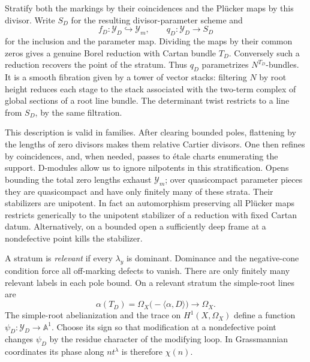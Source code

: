 Stratify both the markings by their coincidences and the Pl\"ucker maps by
this divisor. Write $S_D$ for the resulting divisor-parameter scheme and
\[
 f_D:\mathcal Y_D\hookrightarrow\mathcal Y_m,\qquad
 q_D:\mathcal Y_D\longrightarrow S_D
\]
for the inclusion and the parameter map. Dividing the maps by their common
zeros gives a genuine Borel reduction with Cartan bundle $T_D$.
Conversely such a reduction recovers the point of the stratum. Thus
$q_D$ parametrizes $N^{T_D}$-bundles. It is a smooth fibration given by a
tower of vector stacks: filtering $N$ by root height reduces each stage
to the stack associated with the two-term complex of global sections of
a root line bundle. The determinant twist restricts to a line from $S_D$,
by the same filtration.

This description is valid in families. After clearing bounded poles,
flattening by the lengths of zero divisors makes them relative Cartier
divisors. One then refines by coincidences, and, when needed, passes to
\'etale charts enumerating the support. D-modules allow us to ignore
nilpotents in this stratification. Opens bounding the total zero lengths
exhaust $\mathcal Y_m$; over quasicompact parameter pieces they are
quasicompact and have only finitely many of these strata. Their
stabilizers are unipotent. In fact an automorphism preserving all
Pl\"ucker maps restricts generically to the unipotent stabilizer of a
reduction with fixed Cartan datum. Alternatively, on a bounded open a
sufficiently deep frame at a nondefective point kills the stabilizer.

A stratum is \emph{relevant} if every $\lambda_y$ is dominant. Dominance
and the negative-cone condition force all off-marking defects to vanish.
There are only finitely many relevant labels in each pole bound.
On a relevant stratum the simple-root lines are
\[
 \alpha(T_D)=\Omega_X\bigl(-\langle\alpha,D\rangle\bigr)
 \longrightarrow\Omega_X.
\]
The simple-root abelianization and the trace on $H^1(X,\Omega_X)$ define a
function $\psi_D:\mathcal Y_D\to\mathbb A^1$. Choose its sign so that
modification at a nondefective point changes $\psi_D$ by the residue
character of the modifying loop. In Grassmannian coordinates its phase
along $nt^\lambda$ is therefore $\chi(n)$.

